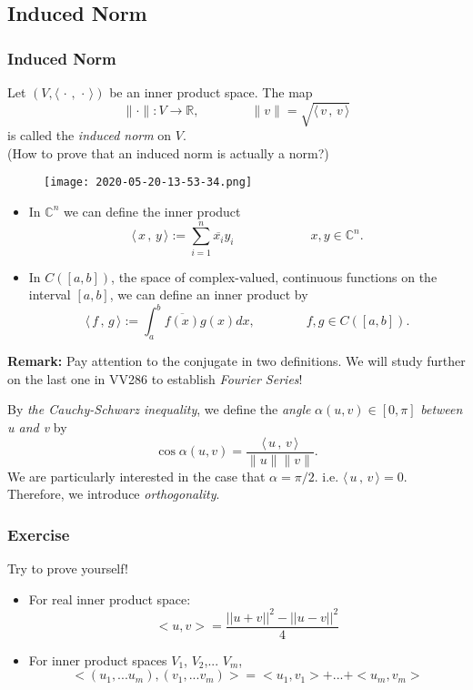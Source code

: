 \documentclass[12pt, t]{beamer}
\renewcommand{\emph}[1]{{\color{Turquoise3}\textsl{#1}}}
\newcommand{\C}{\mathbb{C}} \newcommand{\F}{\mathbb{F}} \newcommand{\R}{\mathbb{R}} \newcommand{\Q}{\mathbb{Q}}
\newcommand{\nullspace}{~\\[15pt]}
\newcommand{\remark}{\textbf{Remark: }}
\newcommand{\scp}[2]{\langle\,#1\,,\,#2\,\rangle} \newcommand{\scpp}{\langle\,\cdot\,,\,\cdot\,\rangle}
\begin{document}
\subsection{Induced Norm}
\begin{frame}[allowframebreaks]
    \frametitle{Induced Norm}
    Let $(V,\scpp)$ be an inner product space. The map
    \[\|\cdot\|:V\rightarrow\R,\qquad\qquad\|v\|=\sqrt{\scp{v}{v}}\]
    is called the \emph{induced norm} on $V$.
    \nullspace
    (How to prove that an induced norm is actually a norm?)

    \begin{figure}[H]
    \centering
    \texttt{[image: 2020-05-20-13-53-34.png]}
    \end{figure}
    
    \newpage
    \begin{itemize}
        \item In $\C^n$ we can define the inner product
            \begin{equation*}
              \scp{x}{y}:=\sum_{i=1}^{n}\overline{x_i}y_i\qquad\qquad
              \qquad x,y\in\C^n.
            \end{equation*}
            \vspace*{-4mm}
        \item In $C([a,b])$, the space of complex-valued, continuous functions on the interval $[a,b]$, we can define an inner product by
            \[\scp{f}{g}:=\int_{a}^{b}\overline{f(x)}g(x)dx,\qquad\qquad
            f,g\in C([a,b]).\]
      \end{itemize}
    \remark Pay attention to the conjugate in two definitions. We will study further on the last one in VV286 to establish \emph{Fourier Series}!

    \newpage
    By \textit{the Cauchy-Schwarz inequality}, we define the \emph{angle} $\alpha(u,v)\in[0,\pi]$ \emph{between u and v} by
    \begin{equation}
        \cos\alpha(u,v)=\frac{\scp{u}{v}}{\|u\|\|v\|}.
    \end{equation}
    We are particularly interested in the case that $\alpha=\pi/2$. i.e. $\scp{u}{v}=0$. Therefore, we introduce \emph{orthogonality}.
\end{frame}

\begin{frame}
    \frametitle{Exercise}
    Try to prove yourself!
    \begin{itemize}
        \item For real inner product space:
        $$<u,v>=\frac{||u+v||^2-||u-v||^2}{4}$$
        \item For inner product spaces $V_1$, $V_2$,... $V_m$,
        $$<(u_1,...u_m),(v_1,...v_m)>=<u_1,v_1>+...+<u_m,v_m>$$
    \end{itemize}
\end{frame}
\end{document}
